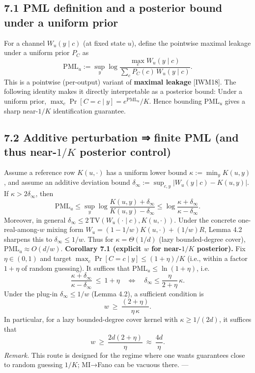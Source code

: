 \documentclass[11pt]{article}
\begin{document}
\hypertarget{pml-definition-and-a-posterior-bound-under-a-uniform-prior}{%
\subsection{7.1 PML definition and a posterior bound under a uniform
prior}\label{pml-definition-and-a-posterior-bound-under-a-uniform-prior}}

For a channel \(W_u(y\mid c)\) (at fixed state \(u\)), define the
pointwise maximal leakage under a uniform prior \(P_C\) as \[
\mathrm{PML}_u:= \sup_y \log\frac{\max_c W_u(y\mid c)}{\sum_c P_C(c)\,W_u(y\mid c)}.
\] This is a pointwise (per-output) variant of \textbf{maximal leakage}
{[}IWM18{]}. The following identity makes it directly interpretable as a
posterior bound: Under a uniform prior,
\(\max_c \Pr[C=c\mid y] = e^{\mathrm{PML}_u}/K\). Hence bounding
\(\mathrm{PML}_u\) gives a sharp near-\(1/K\) identification guarantee.

\hypertarget{additive-perturbation-finite-pml-and-thus-near-1k-posterior-control}{%
\subsection{\texorpdfstring{7.2 Additive perturbation ⇒ finite PML (and
thus near-\(1/K\) posterior
control)}{7.2 Additive perturbation ⇒ finite PML (and thus near-1/K posterior control)}}\label{additive-perturbation-finite-pml-and-thus-near-1k-posterior-control}}

Assume a reference row \(K(u,\cdot)\) has a uniform lower bound
\(\kappa:= \min_y K(u,y)\), and assume an additive deviation bound
\(\delta_\infty:= \sup_{c,y}|W_u(y\mid c)-K(u,y)|\). If
\(\kappa>2\delta_\infty\), then \[
\mathrm{PML}_u \le \sup_y \log\frac{K(u,y)+\delta_\infty}{K(u,y)-\delta_\infty}\le \log\frac{\kappa+\delta_\infty}{\kappa-\delta_\infty}.
\] Moreover, in general
\(\delta_\infty\le 2\,\mathrm{TV}(W_u(\cdot\mid c),K(u,\cdot))\). Under
the concrete one-real-among-\(w\) mixing form
\(W_u=(1-1/w)K(u,\cdot)+(1/w)R\), Lemma 4.2 sharpens this to
\(\delta_\infty\le 1/w\). Thus for \(\kappa=\Theta(1/d)\) (lazy
bounded-degree cover), \(\mathrm{PML}_u\approx O(d/w)\).
\textbf{Corollary 7.1 (explicit \(w\) for near-\(1/K\) posterior).} Fix
\(\eta\in(0,1)\) and target \(\max_c \Pr[C=c\mid y]\le (1+\eta)/K\)
(i.e., within a factor \(1+\eta\) of random guessing). It suffices that
\(\mathrm{PML}_u\le \ln(1+\eta)\), i.e. \[
\frac{\kappa+\delta_\infty}{\kappa-\delta_\infty}\ \le\ 1+\eta
\quad\Longleftrightarrow\quad
\delta_\infty \le \frac{\eta}{2+\eta}\,\kappa.
\] Under the plug-in \(\delta_\infty\le 1/w\) (Lemma 4.2), a sufficient
condition is \[
w \ \ge\ \frac{(2+\eta)}{\eta\,\kappa}.
\] In particular, for a lazy bounded-degree cover kernel with
\(\kappa\ge 1/(2d)\), it suffices that \[
w \ \ge\ \frac{2d(2+\eta)}{\eta}\ \approx\ \frac{4d}{\eta}.
\] \emph{Remark.} This route is designed for the regime where one wants
guarantees close to random guessing \(1/K\); MI→Fano can be vacuous
there. ---
\end{document}
